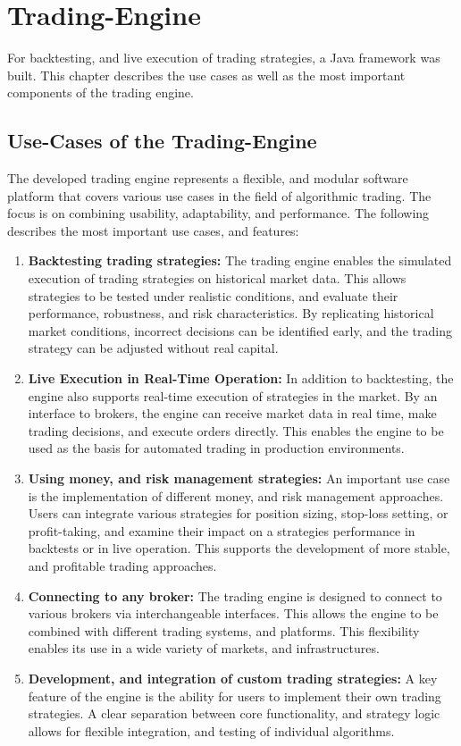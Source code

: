 \section{Trading-Engine}

For backtesting, and live execution of trading strategies, a Java framework was built. This chapter describes the use cases as well as the most important components of the trading engine.

\subsection{Use-Cases of the Trading-Engine}
\label{chap:te-use-cases}

The developed trading engine represents a flexible, and modular software platform that covers various use cases in the field of algorithmic trading. The focus is on combining usability, adaptability, and performance. The following describes the most important use cases, and features:

\begin{enumerate}
    \item \textbf{Backtesting trading strategies:} The trading engine enables the simulated execution of trading strategies on historical market data. This allows strategies to be tested under realistic conditions, and evaluate their performance, robustness, and risk characteristics. By replicating historical market conditions, incorrect decisions can be identified early, and the trading strategy can be adjusted without real capital.
    \item \textbf{Live Execution in Real-Time Operation:} In addition to backtesting, the engine also supports real-time execution of strategies in the market. By an interface to brokers, the engine can receive market data in real time, make trading decisions, and execute orders directly. This enables the engine to be used as the basis for automated trading in production environments.
    \item \textbf{Using money, and risk management strategies:} An important use case is the implementation of different money, and risk management approaches. Users can integrate various strategies for position sizing, stop-loss setting, or profit-taking, and examine their impact on a strategies performance in backtests or in live operation. This supports the development of more stable, and profitable trading approaches.
    \item \textbf{Connecting to any broker:} The trading engine is designed to connect to various brokers via interchangeable interfaces. This allows the engine to be combined with different trading systems, and platforms. This flexibility enables its use in a wide variety of markets, and infrastructures.
    \item \textbf{Development, and integration of custom trading strategies:} A key feature of the engine is the ability for users to implement their own trading strategies. A clear separation between core functionality, and strategy logic allows for flexible integration, and testing of individual algorithms.
\end{enumerate}

